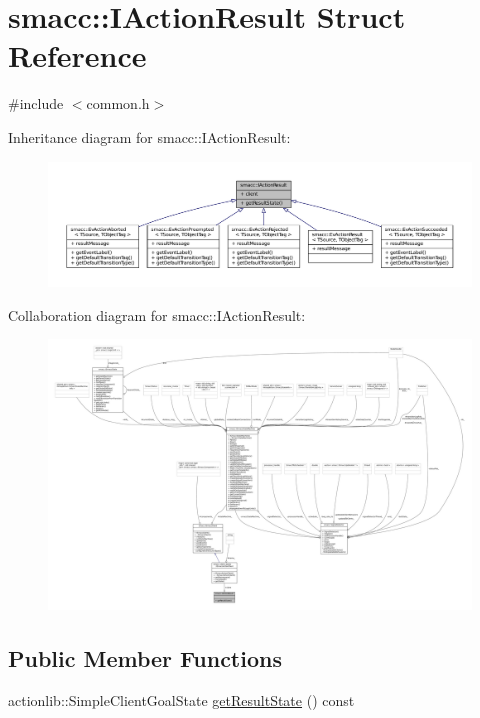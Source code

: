 \hypertarget{structsmacc_1_1IActionResult}{}\section{smacc\+:\+:I\+Action\+Result Struct Reference}
\label{structsmacc_1_1IActionResult}


{\ttfamily \#include $<$common.\+h$>$}



Inheritance diagram for smacc\+:\+:I\+Action\+Result\+:
\nopagebreak
\begin{figure}[H]
\begin{center}
\leavevmode
\includegraphics[width=350pt]{structsmacc_1_1IActionResult__inherit__graph}
\end{center}
\end{figure}


Collaboration diagram for smacc\+:\+:I\+Action\+Result\+:
\nopagebreak
\begin{figure}[H]
\begin{center}
\leavevmode
\includegraphics[width=350pt]{structsmacc_1_1IActionResult__coll__graph}
\end{center}
\end{figure}
\subsection*{Public Member Functions}
\begin{DoxyCompactItemize}
\item 
actionlib\+::\+Simple\+Client\+Goal\+State \hyperlink{structsmacc_1_1IActionResult_af33869a3b1711af070597b8fe605ce70}{get\+Result\+State} () const 
\end{DoxyCompactItemize}
